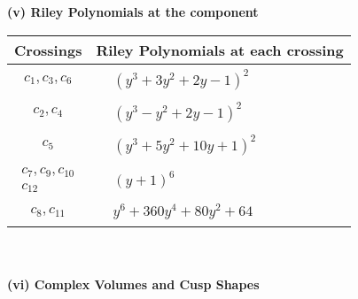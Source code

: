 \documentclass[1p]{elsarticle_modified}
\theoremstyle{definition}
\begin{document}
\newpage\renewcommand{\arraystretch}{1}
\flushleft \textbf{(v) Riley Polynomials at the component}\newline \\
\begin{tabular}{m{50pt}|m{274pt}}
Crossings & \hspace{64pt}Riley Polynomials at each crossing \\
\hline $$\begin{aligned}c_{1},c_{3},c_{6}\end{aligned}$$&$\begin{aligned}
&(y^3+3 y^2+2 y-1)^2
\end{aligned}$\\
\hline $$\begin{aligned}c_{2},c_{4}\end{aligned}$$&$\begin{aligned}
&(y^3- y^2+2 y-1)^2
\end{aligned}$\\
\hline $$\begin{aligned}c_{5}\end{aligned}$$&$\begin{aligned}
&(y^3+5 y^2+10 y+1)^2
\end{aligned}$\\
\hline $$\begin{aligned}c_{7},c_{9},c_{10}\\c_{12}\end{aligned}$$&$\begin{aligned}
&(y+1)^6
\end{aligned}$\\
\hline $$\begin{aligned}c_{8},c_{11}\end{aligned}$$&$\begin{aligned}
&y^6+360 y^4+80 y^2+64
\end{aligned}$\\
\hline
\end{tabular}\\~\\
\newpage\flushleft \textbf{(vi) Complex Volumes and Cusp Shapes}
\end{document}
